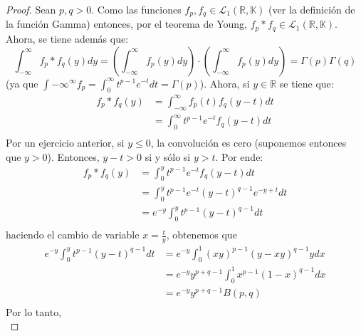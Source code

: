 \documentclass[12pt]{report}
\theoremstyle{largebreak}
\begin{document}
    \begin{proof}
        Sean $p,q>0$. Como las funciones $f_p,f_q\in\mathcal{L}_1(\mathbb{R},\mathbb{K})$ (ver la definición de la función Gamma) entonces, por el teorema de Young, $f_p*f_q\in\mathcal{L}_1(\mathbb{R},\mathbb{K})$. Ahora, se tiene además que:
        \begin{equation*}
            \int_{-\infty}^\infty f_p*f_q(y)dy=\left(\int_{-\infty}^\infty f_p(y)dy \right)\cdot\left(\int_{-\infty}^\infty f_p(y)dy \right)=\Gamma(p)\Gamma(q)
        \end{equation*}
        (ya que $\int{-\infty}^\infty f_p=\int_0^\infty t^{ p-1}e^{-t}dt=\Gamma(p)$). Ahora, si $y\in\mathbb{R}$ se tiene que:
        \begin{equation*}
            \begin{split}
                f_p*f_q(y)&=\int_{-\infty}^\infty f_p(t)f_q(y-t)dt\\
                &=\int_{0}^\infty t^{p-1}e^{-t}f_q(y-t)dt\\
            \end{split}
        \end{equation*}
        Por un ejercicio anterior, si $y\leq 0$, la convolución es cero (suponemos entonces que $y>0$). Entonces, $y-t>0$ si y sólo si $y>t$. Por ende:
        \begin{equation*}
            \begin{split}
                f_p*f_q(y)&=\int_{0}^y t^{p-1}e^{-t}f_q(y-t)dt\\
                &=\int_{0}^y t^{p-1}e^{-t}(y-t)^{q-1}e^{-y+t}dt\\
                &=e^{-y}\int_{0}^y t^{p-1}(y-t)^{q-1}dt\\
            \end{split}
        \end{equation*}
        haciendo el cambio de variable $x=\frac{t}{y}$, obtenemos que
        \begin{equation*}
            \begin{split}
                e^{-y}\int_{0}^y t^{p-1}(y-t)^{q-1}dt&=e^{-y}\int_{0}^1 (xy)^{p-1}(y-xy)^{q-1}ydx\\
                &=e^{-y}y^{ p+q-1}\int_{0}^1 x^{p-1}(1-x)^{q-1}dx\\
                &=e^{-y}y^{ p+q-1}B(p,q)\\
            \end{split}
        \end{equation*}
        Por lo tanto,
        \begin{equation*}

\end{equation*}
\end{proof}
\end{document}
